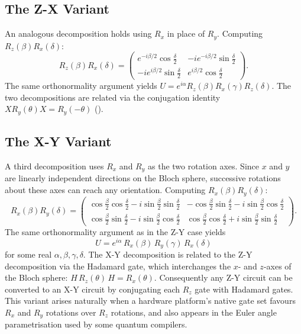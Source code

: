 \documentclass[12pt, a4paper, oneside]{report}
\theoremstyle{plain}
\theoremstyle{definition}
\theoremstyle{remark}
\newcommand{\Rx}{R_x}
\newcommand{\Ry}{R_y}
\newcommand{\Rz}{R_z}
\begin{document}
\subsection{The Z-X Variant}

An analogous decomposition holds using $\Rx$ in place of $\Ry$. Computing $\Rz(\beta)\Rx(\delta)$:
\[
  \Rz(\beta)\Rx(\delta)
  = \begin{pmatrix}
      e^{-i\beta/2}\cos\frac{\delta}{2} & -ie^{-i\beta/2}\sin\frac{\delta}{2}\\
      -ie^{i\beta/2}\sin\frac{\delta}{2} &  e^{i\beta/2}\cos\frac{\delta}{2}
    \end{pmatrix}.
\]
The same orthonormality argument yields $U = e^{i\alpha}\Rz(\beta)\Rx(\gamma)\Rz(\delta)$.
The two decompositions are related via the conjugation identity $X\Ry(\theta)X = \Ry(-\theta)$
().

\subsection{The X-Y Variant}

A third decomposition uses $\Rx$ and $\Ry$ as the two rotation axes. Since $x$ and $y$ are
linearly independent directions on the Bloch sphere, successive rotations about these axes
can reach any orientation. Computing $\Rx(\beta)\Ry(\delta)$:
\[
  \Rx(\beta)\Ry(\delta)
  = \begin{pmatrix}
      \cos\frac{\beta}{2}\cos\frac{\delta}{2} - i\sin\frac{\beta}{2}\sin\frac{\delta}{2} &
      -\cos\frac{\beta}{2}\sin\frac{\delta}{2} - i\sin\frac{\beta}{2}\cos\frac{\delta}{2}\\[4pt]
      \cos\frac{\beta}{2}\sin\frac{\delta}{2} - i\sin\frac{\beta}{2}\cos\frac{\delta}{2} &
       \cos\frac{\beta}{2}\cos\frac{\delta}{2} + i\sin\frac{\beta}{2}\sin\frac{\delta}{2}
    \end{pmatrix}.
\]
The same orthonormality argument as in the Z-Y case yields
\[
  U = e^{i\alpha}\,\Rx(\beta)\,\Ry(\gamma)\,\Rx(\delta)
\]
for some real $\alpha,\beta,\gamma,\delta$. The X-Y decomposition is related to the Z-Y
decomposition via the Hadamard gate, which interchanges the $x$- and $z$-axes of the Bloch
sphere: $H\,\Rz(\theta)\,H = \Rx(\theta)$. Consequently any Z-Y circuit can be converted to
an X-Y circuit by conjugating each $\Rz$ gate with Hadamard gates. This variant arises
naturally when a hardware platform's native gate set favours $\Rx$ and $\Ry$ rotations over
$\Rz$ rotations, and also appears in the Euler angle parametrisation used by some quantum
compilers.
\end{document}
